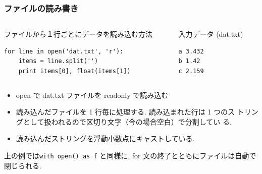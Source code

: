\begin{frame}[t,fragile]
\frametitle{ファイルの読み書き}
\begin{columns}
\begin{column}{8cm}
ファイルから１行ごとにデータを読み込む方法
\begin{lstlisting}
for line in open('dat.txt', 'r'):
    items = line.split('')
    print items[0], float(items[1])
\end{lstlisting}
\end{column}
\begin{column}{4cm}
入力データ (dat.txt)
\begin{lstlisting}
a 3.432
b 1.42
c 2.159
\end{lstlisting}
\end{column}
\end{columns}

\begin{itemize}
\item open で dat.txt ファイルを readonly で読み込む
\item 読み込んだファイルを 1 行毎に処理する. 読み込まれた行は 1 つのス
      トリングとして扱われるので区切り文字（今の場合空白）で分割してい
      る. 
\item 読み込んだストリングを浮動小数点にキャストしている. 
\end{itemize}
  上の例では\verb|with open() as f| と同様に, for 文の終了とともにファイルは自動で閉じられる. 
\end{frame}



